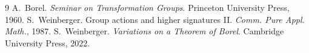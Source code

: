\documentclass[11pt]{article}
\begin{document}
\begin{thebibliography}{9}
 A.~Borel.
  \emph{Seminar on Transformation Groups}. Princeton University Press, 1960.
 S.~Weinberger.
  Group actions and higher signatures II.
  \emph{Comm. Pure Appl. Math.}, 1987.
 S.~Weinberger.
  \emph{Variations on a Theorem of Borel}.
  Cambridge University Press, 2022.
\end{thebibliography}
\end{document}
